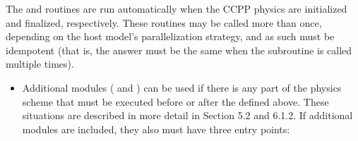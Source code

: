 \documentclass[letterpaper,10pt,english]{sphinxmanual}
\begin{document}
The  and  routines are run automatically when the CCPP physics are initialized and
finalized, respectively.  These routines may be called more than once, depending on the host model’s
parallelization strategy, and as such must be idempotent (that is, the answer must be the same when
the subroutine is called multiple times).
\begin{itemize}
\item {} 
Additional modules ( and ) can be used if there is any part of the physics
scheme that must be executed before or after the  defined above.  These situations are
described in more detail in Section 5.2 and 6.1.2. If additional modules are included, they also
must have three entry points:

\end{itemize}
\end{document}

